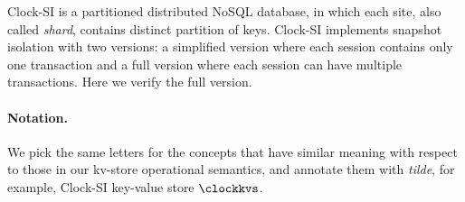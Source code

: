 Clock-SI \citep{clocksi} is a partitioned distributed NoSQL database, 
in which each site, also called \emph{shard},
contains distinct partition of keys.
Clock-SI implements snapshot isolation with two versions:
a simplified version where each session contains only one transaction
and a full version where each session can have multiple transactions.
Here we verify the full version.

\paragraph{Notation.}
We pick the same letters for the concepts that have similar meaning with respect to those in our kv-store operational semantics,
and annotate them with \emph{tilde}, for example, Clock-SI key-value store \( \clockkvs \).

